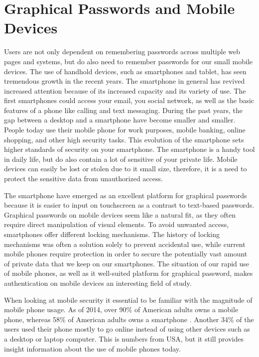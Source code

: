 \section{Graphical Passwords and Mobile Devices}\label{sec:pwmobiledevices}

	Users are not only dependent on remembering passwords across multiple web pages and systems, but do also need to remember passwords for our small mobile devices. The use of handhold devices, such as smartphones and tablet, has seen tremendous growth in the recent years. The smartphone in general has revived increased attention because of its increased capacity and its variety of use. The first smartphones could access your email, you social network, as well as the basic features of a phone like calling and text messaging. During the past years, the gap between a desktop and a smartphone have become smaller and smaller. People today use their mobile phone for work purposes, mobile banking, online shopping, and other high security tasks. This evolution of the smartphone sets higher standards of security on your smartphone. The smartphone is a handy tool in daily life, but do also contain a lot of sensitive of your private life. Mobile devices can easily be lost or stolen due to it small size, therefore, it is a need to protect the sensitive data from unauthorized access. 
  
  The smartphone have emerged as an excellent platform for graphical passwords because it is easier to input on touchscreen as a contrast to text-based passwords. Graphical passwords on mobile devices seem like a natural fit, as they often require direct manipulation of visual elements. To avoid unwanted access, smartphones offer different locking mechanisms. The history of locking mechanisms was often a solution solely to prevent accidental use, while current mobile phones require protection in order to secure the potentially vast amount of private data that we keep on our smartphones. The situation of our rapid use of mobile phones, as well as it well-suited platform for graphical password, makes authentication on mobile devices an interesting field of study.

  When looking at mobile security it essential to be familiar with the magnitude of mobile phone usage. As of 2014, over 90\% of American adults owns a mobile phone, whereas 58\% of American adults owns a smartphone \cite{MobileUseage}. Another 34\% of the users used their phone mostly to go online instead of using other devices such as a desktop or laptop computer. This is numbers from USA, but it still provides insight information about the use of mobile phones today.

